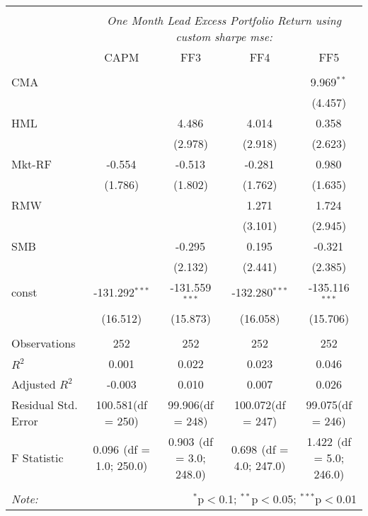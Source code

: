 \begin{table}[!htbp] \centering
\begin{tabular}{@{\extracolsep{5pt}}lcccc}
\\[-1.8ex]\hline
\hline \\[-1.8ex]
& \multicolumn{4}{c}{\textit{One Month Lead Excess Portfolio Return using custom sharpe mse:}} \
\cr \cline{4-5}
\\[-1.8ex] & CAPM & FF3 & FF4 & FF5 \\
\hline \\[-1.8ex]
 CMA & & & & 9.969$^{**}$ \\
  & & & & (4.457) \\
 HML & & 4.486$^{}$ & 4.014$^{}$ & 0.358$^{}$ \\
  & & (2.978) & (2.918) & (2.623) \\
 Mkt-RF & -0.554$^{}$ & -0.513$^{}$ & -0.281$^{}$ & 0.980$^{}$ \\
  & (1.786) & (1.802) & (1.762) & (1.635) \\
 RMW & & & 1.271$^{}$ & 1.724$^{}$ \\
  & & & (3.101) & (2.945) \\
 SMB & & -0.295$^{}$ & 0.195$^{}$ & -0.321$^{}$ \\
  & & (2.132) & (2.441) & (2.385) \\
 const & -131.292$^{***}$ & -131.559$^{***}$ & -132.280$^{***}$ & -135.116$^{***}$ \\
  & (16.512) & (15.873) & (16.058) & (15.706) \\
\hline \\[-1.8ex]
 Observations & 252 & 252 & 252 & 252 \\
 $R^2$ & 0.001 & 0.022 & 0.023 & 0.046 \\
 Adjusted $R^2$ & -0.003 & 0.010 & 0.007 & 0.026 \\
 Residual Std. Error & 100.581(df = 250) & 99.906(df = 248) & 100.072(df = 247) & 99.075(df = 246)  \\
 F Statistic & 0.096$^{}$ (df = 1.0; 250.0) & 0.903$^{}$ (df = 3.0; 248.0) & 0.698$^{}$ (df = 4.0; 247.0) & 1.422$^{}$ (df = 5.0; 246.0) \\
\hline
\hline \\[-1.8ex]
\textit{Note:} & \multicolumn{4}{r}{$^{*}$p$<$0.1; $^{**}$p$<$0.05; $^{***}$p$<$0.01} \\
\end{tabular}
\end{table}
